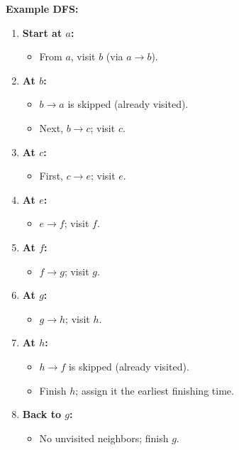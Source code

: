\documentclass{article}
\begin{document}
\textbf{Example DFS:}
\begin{enumerate}[label=\textbf{Step \arabic*:}]
    \item \textbf{Start at \(a\):}
    \begin{itemize}
        \item From \(a\), visit \(b\) (via \(a \to b\)).
    \end{itemize}
    
    \item \textbf{At \(b\):}
    \begin{itemize}
        \item \(b \to a\) is skipped (already visited).
        \item Next, \(b \to c\); visit \(c\).
    \end{itemize}
    
    \item \textbf{At \(c\):}
    \begin{itemize}
        \item First, \(c \to e\); visit \(e\).
    \end{itemize}
    
    \item \textbf{At \(e\):}
    \begin{itemize}
        \item \(e \to f\); visit \(f\).
    \end{itemize}
    
    \item \textbf{At \(f\):}
    \begin{itemize}
        \item \(f \to g\); visit \(g\).
    \end{itemize}
    
    \item \textbf{At \(g\):}
    \begin{itemize}
        \item \(g \to h\); visit \(h\).
    \end{itemize}
    
    \item \textbf{At \(h\):}
    \begin{itemize}
        \item \(h \to f\) is skipped (already visited).
        \item Finish \(h\); assign it the earliest finishing time.
    \end{itemize}
    
    \item \textbf{Back to \(g\):}
    \begin{itemize}
        \item No unvisited neighbors; finish \(g\).
    \end{itemize}
    

\end{enumerate}
\end{document}
